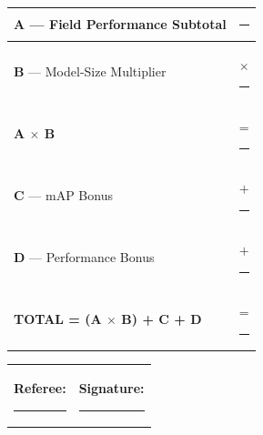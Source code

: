\documentclass[a4]{article}
\begin{document}
\vspace{0.2em}

{\small
\begin{tabular}{|p{6cm}|r|}
\hline
\textbf{A} --- Field Performance Subtotal & \rule{2.5cm}{0.4pt} \\
\hline
\textbf{B} --- Model-Size Multiplier & $\times$ \rule{2cm}{0.4pt} \\
\hline
\textbf{A $\times$ B} & = \rule{2cm}{0.4pt} \\
\hline
\textbf{C} --- mAP Bonus & $+$ \rule{2cm}{0.4pt} \\
\hline
\textbf{D} --- Performance Bonus & $+$ \rule{2cm}{0.4pt} \\
\hline
\textbf{TOTAL = (A $\times$ B) + C + D} & = \rule{2cm}{0.4pt} \\
\hline
\end{tabular}
}

\vspace{0.8em}

\begin{tabular}{p{7cm}p{7cm}}
\textbf{Referee:} \rule{5.5cm}{0.4pt} & \textbf{Signature:} \rule{5.5cm}{0.4pt} \\
\end{tabular}
\end{document}
